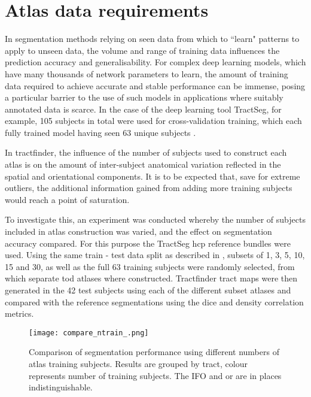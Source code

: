 \section{Atlas data requirements}\label{sec:ntrain}

In segmentation methods relying on seen data from which to ``learn" patterns to apply to unseen data, the volume and range of training data influences the prediction accuracy and generalisability. 
For complex deep learning models, which have many thousands of network parameters to learn, the amount of training data required to achieve accurate and stable performance can be immense, posing a particular barrier to the use of such models in applications where suitably annotated data is scarce.
In the case of the deep learning tool TractSeg\autocite{Wasserthal2018}, for example, 105 subjects in total were used for cross-validation training, which each fully trained model having seen 63 unique subjects .

In tractfinder, the influence of the number of subjects used to construct each atlas is on the amount of inter-subject anatomical variation reflected in the spatial and orientational components.
It is to be expected that, save for extreme outliers, the additional information gained from adding more training subjects would reach a point of saturation.

To investigate this, an experiment was conducted whereby the number of subjects included in atlas construction was varied, and the effect on segmentation accuracy compared.
For this purpose the TractSeg \gls{hcp} reference bundles were used.
Using the same train - test data split as described in , subsets of 1, 3, 5, 10, 15 and 30, as well as the full 63 training subjects were randomly selected, from which separate \gls{tod} atlases where constructed.
Tractfinder tract maps were then generated in the 42 test subjects using each of the different subset atlases and compared with the reference segmentations using the \gls{dice} and density correlation metrics.

\begin{figure}
    \texttt{[image: compare\_ntrain\_.png]}
    \caption{Comparison of segmentation performance using different numbers of atlas training subjects. Results are grouped by tract, colour represents number of training subjects. The IFO and \gls{or} are in places indistinguishable. }
    \label{fig:ntrain}
\end{figure}

